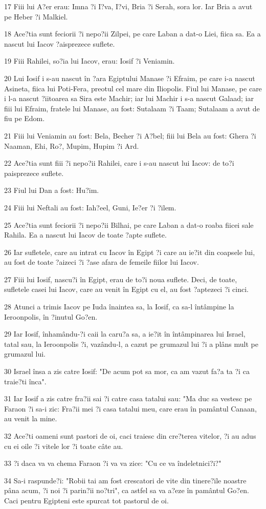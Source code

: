 \par 17 Fiii lui A?er erau: Imna ?i I?va, I?vi, Bria ?i Serah, sora lor. Iar Bria a avut pe Heber ?i Malkiel.
\par 18 Ace?tia sunt feciorii ?i nepo?ii Zilpei, pe care Laban a dat-o Liei, fiica sa. Ea a nascut lui Iacov ?aisprezece suflete.
\par 19 Fiii Rahilei, so?ia lui Iacov, erau: Iosif ?i Veniamin.
\par 20 Lui Iosif i s-au nascut în ?ara Egiptului Manase ?i Efraim, pe care i-a nascut Asineta, fiica lui Poti-Fera, preotul cel mare din Iliopolis. Fiul lui Manase, pe care i l-a nascut ?iitoarea sa Sira este Machir; iar lui Machir i s-a nascut Galaad; iar fiii lui Efraim, fratele lui Manase, au fost: Sutalaam ?i Taam; Sutalaam a avut de fiu pe Edom.
\par 21 Fiii lui Veniamin au fost: Bela, Becher ?i A?bel; fiii lui Bela au fost: Ghera ?i Naaman, Ehi, Ro?, Mupim, Hupim ?i Ard.
\par 22 Ace?tia sunt fiii ?i nepo?ii Rahilei, care i s-au nascut lui Iacov: de to?i paisprezece suflete.
\par 23 Fiul lui Dan a fost: Hu?im.
\par 24 Fiii lui Neftali au fost: Iah?eel, Guni, Ie?er ?i ?ilem.
\par 25 Ace?tia sunt feciorii ?i nepo?ii Bilhai, pe care Laban a dat-o roaba fiicei sale Rahila. Ea a nascut lui Iacov de toate ?apte suflete.
\par 26 Iar sufletele, care au intrat cu Iacov în Egipt ?i care au ie?it din coapsele lui, au fost de toate ?aizeci ?i ?ase afara de femeile fiilor lui Iacov.
\par 27 Fiii lui Iosif, nascu?i în Egipt, erau de to?i noua suflete. Deci, de toate, sufletele casei lui Iacov, care au venit în Egipt cu el, au fost ?aptezeci ?i cinci.
\par 28 Atunci a trimis Iacov pe Iuda înaintea sa, la Iosif, ca sa-l întâmpine la Ieroonpolis, în ?inutul Go?en.
\par 29 Iar Iosif, înhamându-?i caii la caru?a sa, a ie?it în întâmpinarea lui Israel, tatal sau, la Ieroonpolis ?i, vazându-l, a cazut pe grumazul lui ?i a plâns mult pe grumazul lui.
\par 30 Israel însa a zis catre Iosif: "De acum pot sa mor, ca am vazut fa?a ta ?i ca traie?ti înca".
\par 31 Iar Iosif a zis catre fra?ii sai ?i catre casa tatalui sau: "Ma duc sa vestesc pe Faraon ?i sa-i zic: Fra?ii mei ?i casa tatalui meu, care erau în pamântul Canaan, au venit la mine.
\par 32 Ace?ti oameni sunt pastori de oi, caci traiesc din cre?terea vitelor, ?i au adus cu ei oile ?i vitele lor ?i toate câte au.
\par 33 ?i daca va va chema Faraon ?i va va zice: "Cu ce va îndeletnici?i?"
\par 34 Sa-i raspunde?i: "Robii tai am fost crescatori de vite din tinere?ile noastre pâna acum, ?i noi ?i parin?ii no?tri", ca astfel sa va a?eze în pamântul Go?en. Caci pentru Egipteni este spurcat tot pastorul de oi.

